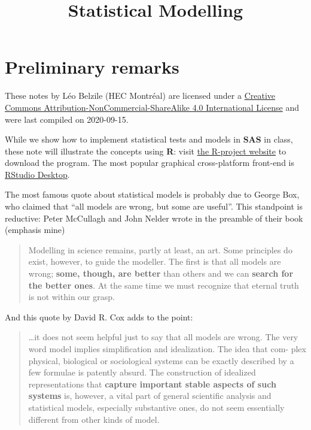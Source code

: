 \documentclass[
  11pt,
  letterpaper,
]{book}
\title{Statistical Modelling}
\author{}
\date{\vspace{-2.5em}}
\let\oldhref\href
\renewcommand{\href}[2]{#2\footnote{\url{#1}}}
\theoremstyle{definition}
\theoremstyle{definition}
\theoremstyle{definition}
\theoremstyle{remark}
\begin{document}
\maketitle

\let\href\oldhref

{
\setcounter{tocdepth}{1}
\tableofcontents
}
\hypertarget{preliminary-remarks}{%
\chapter*{Preliminary remarks}\label{preliminary-remarks}}

These notes by Léo Belzile (HEC Montréal) are licensed under a \href{http://creativecommons.org/licenses/by-nc-sa/4.0/}{Creative Commons Attribution-NonCommercial-ShareAlike 4.0 International License} and were last compiled on 2020-09-15.

While we show how to implement statistical tests and models in \textbf{SAS} in class, these note will illustrate the concepts using \textbf{R}: visit \href{https://cran.r-project.org/}{the R-project website} to download the program. The most popular graphical cross-platform front-end is \href{https://www.rstudio.com/products/rstudio/download/}{RStudio Desktop}.

The most famous quote about statistical models is probably due to George Box, who claimed that ``all models are wrong, but some are useful''. This standpoint is reductive: Peter McCullagh and John Nelder wrote in the preamble of their book (emphasis mine)

\begin{quote}
Modelling in science remains, partly at least, an art. Some principles do exist, however, to guide the modeller. The first is that all models are wrong; \textbf{some, though, are better} than others and we can \textbf{search for the better ones}. At the same time we must recognize that eternal truth is not within our grasp.
\end{quote}

And this quote by David R. Cox adds to the point:

\begin{quote}
\ldots it does not seem helpful just to say that all models are wrong. The very word model implies simplification and idealization. The idea that com-
plex physical, biological or sociological systems can be exactly described
by a few formulae is patently absurd. The construction of idealized representations that \textbf{capture important stable aspects of such systems}
is, however, a vital part of general scientific analysis and statistical models, especially substantive ones, do not seem essentially different from
other kinds of model.
\end{quote}
\end{document}
